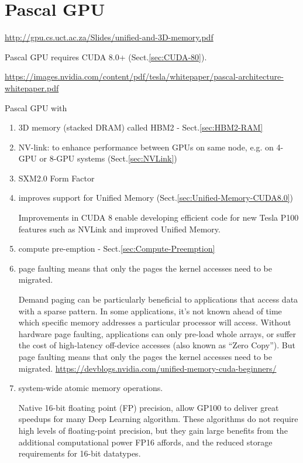 \chapter{Pascal GPU}
\label{chap:Pascal-GPU}
\label{sec:Pascal-GPU}

\url{http://gpu.cs.uct.ac.za/Slides/unified-and-3D-memory.pdf}

Pascal GPU requires CUDA 8.0+ (Sect.\ref{sec:CUDA-80}).

\url{https://images.nvidia.com/content/pdf/tesla/whitepaper/pascal-architecture-whitepaper.pdf}

Pascal GPU with 
\begin{enumerate}
  \item 3D memory (stacked DRAM) called HBM2 - Sect.\ref{sec:HBM2-RAM}


  \item NV-link: to enhance performance between GPUs on same node, e.g. on 4-GPU or 8-GPU systems (Sect.\ref{sec:NVLink})

  \item SXM2.0 Form Factor
  
  
  \item improves support for Unified Memory (Sect.\ref{sec:Unified-Memory-CUDA8.0})

Improvements in CUDA 8 enable developing efficient code for new Tesla P100
features such as NVLink and improved Unified Memory.

  \item  compute pre-emption - Sect.\ref{sec:Compute-Preemption}
  
  \item page faulting means that only the pages the kernel accesses need to be migrated.
  
  Demand paging can be particularly beneficial to applications that access data
  with a sparse pattern. In some applications, it’s not known ahead of time
  which specific memory addresses a particular processor will access. Without
  hardware page faulting, applications can only pre-load whole arrays, or suffer
  the cost of high-latency off-device accesses (also known as “Zero Copy”). But
  page faulting means that only the pages the kernel accesses need to be
  migrated.
  \url{https://devblogs.nvidia.com/unified-memory-cuda-beginners/}
  

\item   system-wide atomic memory operations.

Native 16-bit floating point (FP) precision, allow GP100 to deliver great
speedups for many Deep Learning algorithm. These algorithms do not require high
levels of floating-point precision, but they gain large benefits from the
additional computational power FP16 affords, and the reduced storage
requirements for 16-bit datatypes.

\end{enumerate}

